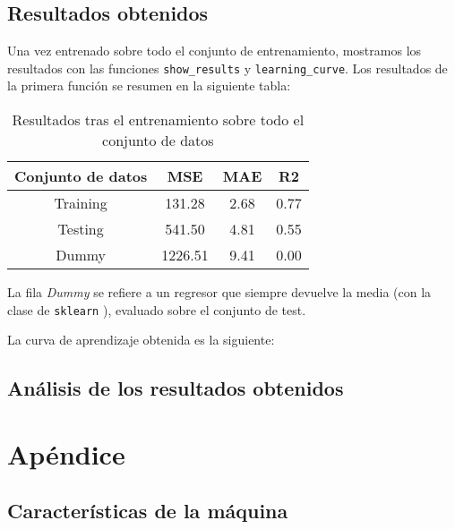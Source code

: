 \documentclass[11pt]{article}
\begin{document}
\subsection{Resultados obtenidos}

Una vez entrenado sobre todo el conjunto de entrenamiento, mostramos los resultados con las funciones \lstinline{show_results} y \lstinline{learning_curve}. Los resultados de la primera función se resumen en la siguiente tabla:

\begin{table}[H]
    \centering
    \begin{tabular}{|c|c|c|c|}
    \hline
    Conjunto de datos  & MSE & MAE & R2 \\
    \hline
    Training & 131.28  & 2.68 & 0.77 \\
    Testing  & 541.50  & 4.81 & 0.55 \\
    Dummy    & 1226.51 & 9.41 & 0.00 \\
    \hline
    \end{tabular}
    \caption{Resultados tras el entrenamiento sobre todo el conjunto de datos}
\end{table}

La fila \emph{Dummy} se refiere a un regresor que siempre devuelve la media (con la clase de \lstinline{sklearn} ), evaluado sobre el conjunto de test.

La curva de aprendizaje obtenida es la siguiente:

\subsection{Análisis de los resultados obtenidos}

\pagebreak
\section{Apéndice} \label{apendice}

\subsection{Características de la máquina}
\end{document}
